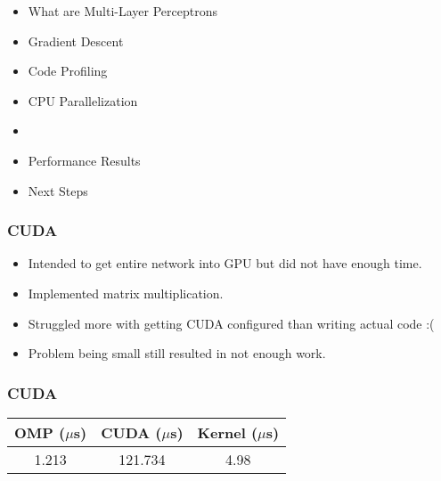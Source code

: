 \begin{frame}
\begin{itemize}
    \item What are Multi-Layer Perceptrons
    \item Gradient Descent
    \item Code Profiling
    \item CPU Parallelization
    \item \textbf{\color{red}{GPU Parallelization}}
    \item Performance Results
    \item Next Steps
\end{itemize}
\end{frame}

\begin{frame}
    \frametitle{CUDA}
    \begin{itemize}
        \item Intended to get entire network into GPU but did not have enough
            time.
        \item Implemented matrix multiplication.
        \item Struggled more with getting CUDA configured than writing actual
            code :(
        \item Problem being small still resulted in not enough work.
    \end{itemize}
\end{frame}

\begin{frame}
    \frametitle{CUDA}
    \begin{centering}
    \begin{tabular}{|c|c|c|}
        \hline
        OMP ($\mu$s) & CUDA ($\mu$s) & Kernel ($\mu$s) \\
        \hline
        1.213 & 121.734 & 4.98\\
        \hline
    \end{tabular}
    \end{centering}
\end{frame}
